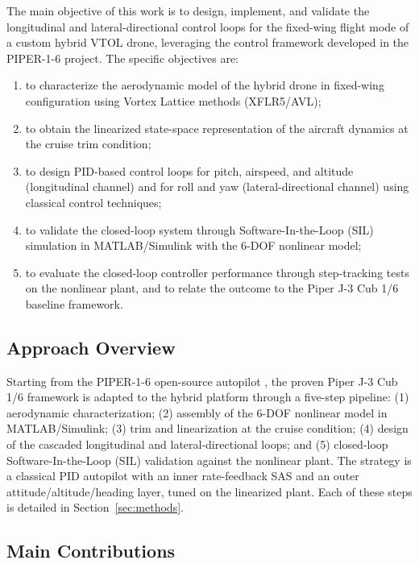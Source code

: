 \documentclass{ieeeaccess}
\begin{document}
The main objective of this work is to design, implement, and validate the longitudinal and lateral-directional control loops for the fixed-wing flight mode of a custom hybrid VTOL drone, leveraging the control framework developed in the PIPER-1-6 project. The specific objectives are:
\begin{enumerate}
    \item to characterize the aerodynamic model of the hybrid drone in fixed-wing configuration using Vortex Lattice methods (XFLR5/AVL);
    \item to obtain the linearized state-space representation of the aircraft dynamics at the cruise trim condition;
    \item to design PID-based control loops for pitch, airspeed, and altitude (longitudinal channel) and for roll and yaw (lateral-directional channel) using classical control techniques;
    \item to validate the closed-loop system through Software-In-the-Loop (SIL) simulation in MATLAB/Simulink with the 6-DOF nonlinear model;
    \item to evaluate the closed-loop controller performance through step-tracking tests on the nonlinear plant, and to relate the outcome to the Piper J-3 Cub 1/6 baseline framework.
\end{enumerate}

\subsection{Approach Overview}

Starting from the PIPER-1-6 open-source autopilot \cite{martins2025piper}, the proven Piper J-3 Cub 1/6 framework is adapted to the hybrid platform through a five-step pipeline: (1) aerodynamic characterization; (2) assembly of the 6-DOF nonlinear model in MATLAB/Simulink; (3) trim and linearization at the cruise condition; (4) design of the cascaded longitudinal and lateral-directional loops; and (5) closed-loop Software-In-the-Loop (SIL) validation against the nonlinear plant. The strategy is a classical PID autopilot with an inner rate-feedback SAS and an outer attitude/altitude/heading layer, tuned on the linearized plant. Each of these steps is detailed in Section~\ref{sec:methods}.

\subsection{Main Contributions}
\end{document}
